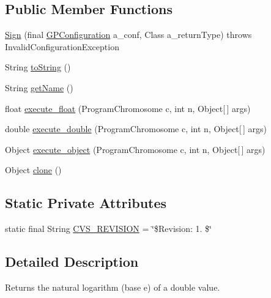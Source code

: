 \subsection*{Public Member Functions}
\begin{DoxyCompactItemize}
\item 
\hyperlink{classexamples_1_1gp_1_1symbolic_regression_1_1_sign_ae7dac96ac8846203a3e76ddcb0f35b9b}{Sign} (final \hyperlink{classorg_1_1jgap_1_1gp_1_1impl_1_1_g_p_configuration}{G\-P\-Configuration} a\-\_\-conf, Class a\-\_\-return\-Type)  throws Invalid\-Configuration\-Exception 
\item 
String \hyperlink{classexamples_1_1gp_1_1symbolic_regression_1_1_sign_a203d3bf8eb04a3fda202b952c5b70739}{to\-String} ()
\item 
String \hyperlink{classexamples_1_1gp_1_1symbolic_regression_1_1_sign_aa00c4d6467878fec5687eaebb7415ef2}{get\-Name} ()
\item 
float \hyperlink{classexamples_1_1gp_1_1symbolic_regression_1_1_sign_a149ea9d513e1be6d31d6ff0599750042}{execute\-\_\-float} (Program\-Chromosome c, int n, Object\mbox{[}$\,$\mbox{]} args)
\item 
double \hyperlink{classexamples_1_1gp_1_1symbolic_regression_1_1_sign_aeb10b8726caf32eccb67117bd1e71a9b}{execute\-\_\-double} (Program\-Chromosome c, int n, Object\mbox{[}$\,$\mbox{]} args)
\item 
Object \hyperlink{classexamples_1_1gp_1_1symbolic_regression_1_1_sign_a2e5ce884501e42f7e4284224391322ac}{execute\-\_\-object} (Program\-Chromosome c, int n, Object\mbox{[}$\,$\mbox{]} args)
\item 
Object \hyperlink{classexamples_1_1gp_1_1symbolic_regression_1_1_sign_ae55e86a3e4de0bcbff5e258a4360f5e3}{clone} ()
\end{DoxyCompactItemize}
\subsection*{Static Private Attributes}
\begin{DoxyCompactItemize}
\item 
static final String \hyperlink{classexamples_1_1gp_1_1symbolic_regression_1_1_sign_a48b58b94427db5f753feacb7bf870327}{C\-V\-S\-\_\-\-R\-E\-V\-I\-S\-I\-O\-N} = \char`\"{}\$Revision\-: 1. \$\char`\"{}
\end{DoxyCompactItemize}


\subsection{Detailed Description}
Returns the natural logarithm (base e) of a double value.

